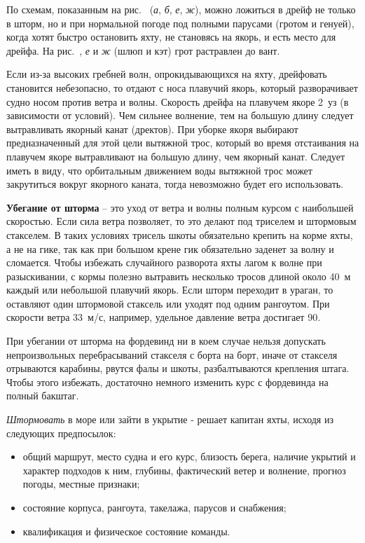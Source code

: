 По схемам, показанным на рис.~ (\textit{а}, \textit{б},
\textit{е}, \textit{ж}), можно ложиться в дрейф не только в шторм, но
и при нормальной погоде под полными парусами (гротом и генуей), когда
хотят быстро остановить яхту, не становясь на якорь, и есть место для
дрейфа. На рис.~, \textit{е} и \textit{ж} (шлюп и кэт) грот
растравлен до вант.

Если из-за высоких гребней волн, опрокидывающихся на яхту, дрейфовать
становится небезопасно, то отдают с носа плавучий якорь, который
разворачивает судно носом против ветра и волны. Скорость дрейфа на
плавучем якоре 2~уз (в зависимости от условий). Чем сильнее
волнение, тем на большую длину следует вытравливать якорный канат
(дректов). При уборке якоря выбирают предназначенный для этой цели
вытяжной трос, который во время отстаивания на плавучем якоре
вытравливают на большую длину, чем якорный канат. Следует иметь в
виду, что орбитальным движением воды вытяжной трос может закрутиться
вокруг якорного каната, тогда невозможно будет его использовать.

\textbf{Убегание от шторма} \--- это уход от
ветра и волны полным курсом с наибольшей скоростью. Если сила ветра
позволяет, то это делают под триселем и штормовым стакселем. В таких
условиях трисель шкоты обязательно крепить на корме яхты, а не на
гике, так как при большом крене гик обязательно заденет за волну и
сломается. Чтобы избежать случайного разворота яхты лагом к волне при
разыскивании, с кормы полезно вытравить несколько тросов длиной около
40~м каждый или небольшой плавучий якорь. Если шторм переходит
в ураган, то оставляют один штормовой стаксель или уходят под одним
рангоутом. При скорости ветра 33~м/с, например, удельное давление
ветра достигает 90\kgmsq.

При убегании от шторма на фордевинд ни в коем случае нельзя допускать
непроизвольных перебрасываний стакселя с борта на борт, иначе от
стакселя отрываются карабины, рвутся фалы и шкоты, разбалтываются
крепления штага. Чтобы этого избежать, достаточно немного изменить
курс с фордевинда на полный бакштаг.

\textit{Штормовать} в море или зайти в укрытие - решает капитан яхты, исходя из
следующих предпосылок:
\begin{itemize}
\item общий маршрут, место судна и его курс, близость берега, наличие
  укрытий и характер подходов к ним, глубины, фактический ветер и
  волнение, прогноз погоды, местные признаки;
\item состояние корпуса, рангоута, такелажа, парусов и снабжения; 
\item квалификация и физическое состояние команды. 
\end{itemize}

